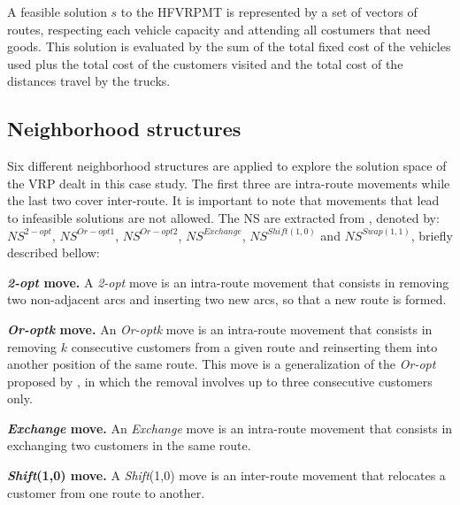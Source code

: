 \documentclass{endm}
\begin{document}
A feasible solution $s$ to the HFVRPMT is represented by a set of vectors of routes, respecting each vehicle capacity and attending all costumers that need goods.
This solution is evaluated by the sum of the total fixed cost of the vehicles used plus the total cost of the customers visited and the total cost of the distances travel by the trucks.

\subsection{Neighborhood structures} \label{subSec:HFVRP:NeighStructures}

Six different neighborhood structures are applied to explore the solution space of the VRP dealt in this case study. 
The first three are intra-route movements while the last two cover inter-route. 
It is important to note that movements that lead to infeasible solutions are not allowed.
The NS are extracted from \cite{penna2013,Coelho2016}, denoted by: $NS^{2-opt}$, $NS^{Or-opt1}$, $NS^{Or-opt2}$, $NS^{Exchange}$, $NS^{Shift(1,0)}$ and $NS^{Swap(1,1)}$, briefly described bellow:

\textbf{\textit{2-opt} move.} A \textit{2-opt} move is an intra-route movement that consists in removing two non-adjacent arcs and inserting two new arcs, so that a new route is formed.

%

\textbf{\textit{Or-optk} move.} An \textit{Or-optk} move is an intra-route movement that consists in removing $k$ consecutive customers from a given route and reinserting them into another position of the same route.
This move is a generalization of the \textit{Or-opt} proposed by \cite{or76}, in which the removal involves up to three consecutive customers only.

\textbf{\textit{Exchange} move.} An \textit{Exchange} move is an intra-route movement that consists in exchanging two customers in the same route. 

\textbf{\textit{Shift}(1,0) move.} A \textit{Shift}(1,0) move is an inter-route movement that relocates a customer from one route to another.
\end{document}
